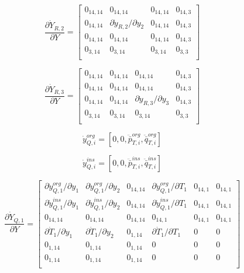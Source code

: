 \documentclass[a4paper,10pt]{article}
\begin{document}
\begin{equation}
\frac{\partial\dot{Y}_{R,2}}{\partial Y}=
\left[ \begin{array}{cccc}
0_{14 , 14} & 0_{14 , 14} & 0_{14 , 14} & 0_{14 , 3}\\
0_{14 , 14} & \partial \dot{y}_{R,2} / \partial y_2 & 0_{14 , 14} & 0_{14 , 3}\\
0_{14 , 14} & 0_{14 , 14} & 0_{14 , 14} & 0_{14 , 3}\\
0_{3 , 14} & 0_{3 , 14} & 0_{3 , 14} & 0_{3 , 3}\\
\end{array}  \right]
\end{equation}

\begin{equation}
\frac{\partial\dot{Y}_{R,3}}{\partial Y}=
\left[ \begin{array}{cccc}
0_{14 , 14} & 0_{14 , 14} & 0_{14 , 14} & 0_{14 , 3}\\
0_{14 , 14} & 0_{14 , 14} & 0_{14 , 14} & 0_{14 , 3}\\
0_{14 , 14} & 0_{14 , 14} & \partial \dot{y}_{R,3} / \partial y_3 & 0_{14 , 3}\\
0_{3 , 14} & 0_{3 , 14} & 0_{3 , 14} & 0_{3 , 3}\\
\end{array}  \right]
\end{equation}


\begin{equation}
\dot{y}_{Q,i}^{org} = [0, 0, \ddot{\bar{p}}_{T,i}^{org}, \ddot{\bar{q}}_{T,i}^{org}]
\end{equation}

\begin{equation}
\dot{y}_{Q,i}^{ins} = [0, 0, \ddot{\bar{p}}_{T,i}^{ins}, \ddot{\bar{q}}_{T,i}^{ins}]
\end{equation}

\begin{equation}
\frac{\partial\dot{Y}_{Q,1}}{\partial Y}=
\left[ \begin{array}{cccccc}
\partial\dot{y}_{Q,1}^{org} / \partial y_1 & \partial\dot{y}_{Q,1}^{org} / \partial y_2 & 0_{14,14} & \partial\dot{y}_{Q,1}^{org} / \partial T_1 & 0_{14,1} & 0_{14,1}\\
\partial\dot{y}_{Q,1}^{ins} / \partial y_1 & \partial\dot{y}_{Q,1}^{ins} / \partial y_2 & 0_{14,14} & \partial\dot{y}_{Q,1}^{ins} / \partial T_1 & 0_{14,1} & 0_{14,1}\\
0_{14,14} & 0_{14,14} & 0_{14,14} & 0_{14,1} & 0_{14,1} & 0_{14,1} \\
\partial\dot{T}_1 / \partial y_1 & \partial\dot{T}_1 / \partial y_2  & 0_{1,14} & \partial\dot{T}_1 / \partial T_1 & 0 & 0\\
0_{1,14} & 0_{1,14} & 0_{1,14} & 0 & 0 & 0\\
0_{1,14} & 0_{1,14} & 0_{1,14} & 0 & 0 & 0\\
\end{array}  \right]
\end{equation}
\end{document}
